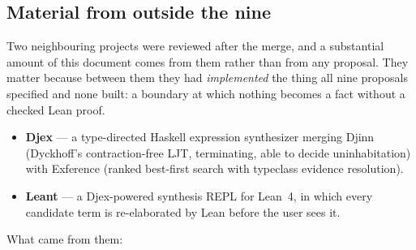 \subsection{Material from outside the nine}
\label{sec:external-sources}

Two neighbouring projects were reviewed after the merge, and a substantial
amount of this document comes from them rather than from any proposal. They
matter because between them they had \emph{implemented} the thing all nine
proposals specified and none built: a boundary at which nothing becomes a fact
without a checked Lean proof.

\begin{itemize}[leftmargin=1.4em]
\item \textbf{Djex} --- a type-directed Haskell expression synthesizer merging
  Djinn (Dyckhoff's contraction-free \textsf{LJT}, terminating, able to decide
  uninhabitation) with Exference (ranked best-first search with typeclass
  evidence resolution).
\item \textbf{Leant} --- a Djex-powered synthesis REPL for Lean~4, in which
  every candidate term is re-elaborated by Lean before the user sees it.
\end{itemize}

What came from them:

